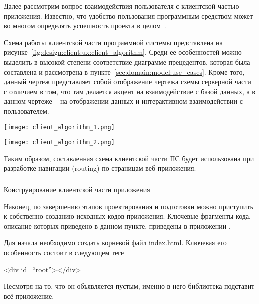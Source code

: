 Далее рассмотрим вопрос взаимодействия пользователя с клиентской частью приложения. Известно, что удобство пользования программным средством может во многом определять успешность проекта в целом~\cite[с.~44]{code_complete}.

Схема работы клиентской части программной системы представлена на рисунке~\ref{fig:design:client:ux:client_algorithm}. Среди ее особенностей можно выделить в высокой степени соответствие диаграмме прецедентов, которая была составлена и рассмотрена в пункте~\ref{sec:domain:model:use_cases}. Кроме того, данный чертеж представляет собой отображение чертежа схемы серверной части с отличием в том, что там делается акцент на взаимодействие с базой данных, а в данном чертеже -- на отображении данных и интерактивном взаимодействии с пользователем. 

\begin{sidewaysfigure}
\centering
	\texttt{[image: client\_algorithm\_1.png]}
	\caption{Схема программы клиентской части программного средства}
	\label{fig:design:client:ux:client_algorithm}
\end{sidewaysfigure}

\begin{sidewaysfigure}
\ContinuedFloat
\centering
	\texttt{[image: client\_algorithm\_2.png]}
	\caption{Схема программы клиентской части программного средства (окончание)}
\end{sidewaysfigure}

Таким образом, составленная схема клиентской части ПС будет использована при разработке навигации (routing) по страницам веб-приложе\-ния.

\subsubsection{} Конструирование клиентской части приложения
\label{sec:design:client:development}

Наконец, по завершению этапов проектирования и подготовки можно приступить к собственно созданию исходных кодов приложения. Ключевые фрагменты кода, описание которых приведено в данном пункте, приведены в приложении \sourcecodeappendix.

Для начала необходимо создать корневой файл index.html. Ключевая его особенность состоит в следующем теге
\begin{flushleft}
\qquad\qquad\qquad\qquad\qquad <div id=``root''></div>
\end{flushleft}

Несмотря на то, что он объявляется пустым, именно в него библиотека \react подставит всё приложение.

